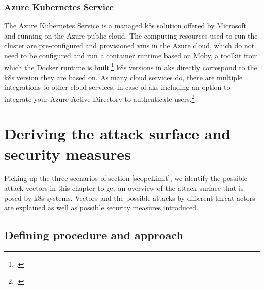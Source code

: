 \subsection{Azure Kubernetes Service}

The Azure Kubernetes Service is a managed \gls{k8s} solution offered by Microsoft and running on the Azure public cloud. 
The computing resources used to run the cluster are pre-configured and provisioned \gls{vm}s in the Azure cloud, which do not need to be configured and run a container runtime based on Moby, a toolkit from which the Docker runtime is built.\footcite[][, section 'What is Moby?']{dockerMoby} 
\gls{k8s} versions in \gls{aks} directly correspond to the \gls{k8s} version they are based on.
As many cloud services do, there are multiple integrations to other cloud services, in case of \gls{aks} including an option to integrate your Azure Active Directory to authenticate users.\footcite[][, first paragraph]{aadAksAuth}



\chapter{Deriving the attack surface and security measures}

Picking up the three scenarios of section \ref{scopeLimit}, we identify the possible attack vectors in this chapter to get an overview of the attack surface that is posed by \gls{k8s} systems. Vectors and the possible attacks by different threat actors are explained as well as possible security measures introduced.

\section{Defining procedure and approach}

